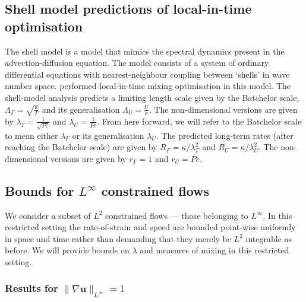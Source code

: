\documentclass[12pt]{iopart}
\renewcommand{\vec}[1]{\mathbf{#1}}
\newcommand{\linf}[1]{\| #1 \|_{L^{\infty}}}
\begin{document}
\subsection{Shell model predictions of local-in-time optimisation}

The shell model is a model that mimics the spectral dynamics present in the advection-diffusion equation. The model consists of a system of ordinary differential equations with nearest-neighbour coupling between `shells' in wave number space. \cite{Miles2017a} performed local-in-time mixing optimisation in this model. The shell-model analysis predicts a limiting length scale given by the Batchelor scale, $\Lambda_{\Gamma} =\sqrt{\frac{\kappa}{\Gamma}}$  and its generalisation $\Lambda_{U}= \frac{U}{\kappa} $. The non-dimensional versions are given by $\lambda_{\Gamma}= \frac{1}{\sqrt{Pe}}$ and $\lambda_{U} = \frac{1}{Pe}$. From here forward, we will refer to the Batchelor scale to mean either $\lambda_{\Gamma}$ or its generalisation $\lambda_{U}$.  The predicted long-term rates (after reaching the Batchelor scale) are given by $R_{\Gamma} =\kappa/\lambda_{\Gamma}^2 $  and  $R_{U}=\kappa/\lambda_{U}^2$.  The non-dimensional versions are given by $r_{\Gamma} =1$ and $r_{U} = Pe $.

\subsection{Bounds for $L^{\infty}$ constrained flows}
We consider a subset of $L^{2}$ constrained flows --- those belonging to $L^{\infty}$. In this restricted setting the rate-of-strain and speed are bounded point-wise uniformly in space and time rather than demanding that they merely be $L^2$ integrable as before. We will provide bounds on $\lambda$ and measures of mixing in this restricted setting. 

\label{sec:linfty_flows}
\subsubsection{Results for $\linf{\nabla \vec{u}} = 1$}
\end{document}
